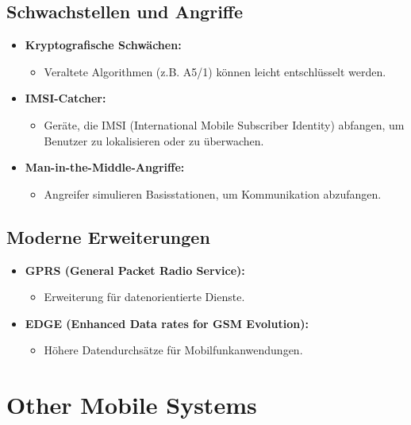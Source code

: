 \documentclass{article}
\begin{document}
\subsection{Schwachstellen und Angriffe}
\begin{itemize}
    \item \textbf{Kryptografische Schwächen:}
    \begin{itemize}
        \item Veraltete Algorithmen (z.B. A5/1) können leicht entschlüsselt werden.
    \end{itemize}
    \item \textbf{IMSI-Catcher:}
    \begin{itemize}
        \item Geräte, die IMSI (International Mobile Subscriber Identity) abfangen, um Benutzer zu lokalisieren oder zu überwachen.
    \end{itemize}
    \item \textbf{Man-in-the-Middle-Angriffe:}
    \begin{itemize}
        \item Angreifer simulieren Basisstationen, um Kommunikation abzufangen.
    \end{itemize}
\end{itemize}

\subsection{Moderne Erweiterungen}
\begin{itemize}
    \item \textbf{GPRS (General Packet Radio Service):}
    \begin{itemize}
        \item Erweiterung für datenorientierte Dienste.
    \end{itemize}
    \item \textbf{EDGE (Enhanced Data rates for GSM Evolution):}
    \begin{itemize}
        \item Höhere Datendurchsätze für Mobilfunkanwendungen.
    \end{itemize}
\end{itemize}


\section{Other Mobile Systems}
\end{document}
